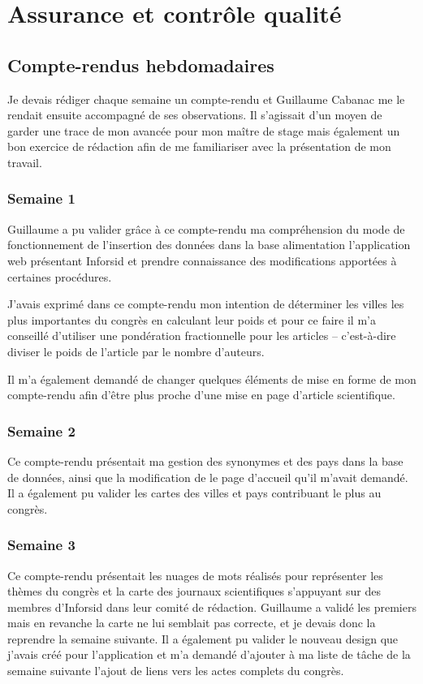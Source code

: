 \cleardoublepage
{}

\chapter{Assurance et contrôle qualité}



\section{Compte-rendus hebdomadaires}
	Je devais rédiger chaque semaine un compte-rendu et Guillaume Cabanac me le rendait ensuite accompagné de ses observations. Il s'agissait d'un moyen de garder une trace de mon avancée pour mon maître de stage mais également un bon exercice de rédaction afin de me familiariser avec la présentation de mon travail.
	
	
	\subsection{Semaine 1}
		Guillaume a pu valider grâce à ce compte-rendu ma compréhension du mode de fonctionnement de l'insertion des données dans la base alimentation l'application web présentant Inforsid et prendre connaissance des modifications apportées à certaines procédures.
		
		J'avais exprimé dans ce compte-rendu mon intention de déterminer les villes les plus importantes du congrès en calculant leur poids et pour ce faire il m'a conseillé d'utiliser une pondération fractionnelle pour les articles -- c'est-à-dire diviser le poids de l'article par le nombre d'auteurs.
		
		Il m'a également demandé de changer quelques éléments de mise en forme de mon compte-rendu afin d'être plus proche d'une mise en page d'article scientifique.
	
	
	\subsection{Semaine 2}
		Ce compte-rendu présentait ma gestion des synonymes et des pays dans la base de données, ainsi que la modification de le page d'accueil qu'il m'avait demandé. Il a également pu valider les cartes des villes et pays contribuant le plus au congrès.
	
	
	\subsection{Semaine 3}
		Ce compte-rendu présentait les nuages de mots réalisés pour représenter les thèmes du congrès et la carte des journaux scientifiques s'appuyant sur des membres d'Inforsid dans leur comité de rédaction. Guillaume a validé les premiers mais en revanche la carte ne lui semblait pas correcte, et je devais donc la reprendre la semaine suivante.
		Il a également pu valider le nouveau design que j'avais créé pour l'application et m'a demandé d'ajouter à ma liste de tâche de la semaine suivante l'ajout de liens vers les actes complets du congrès.
	
